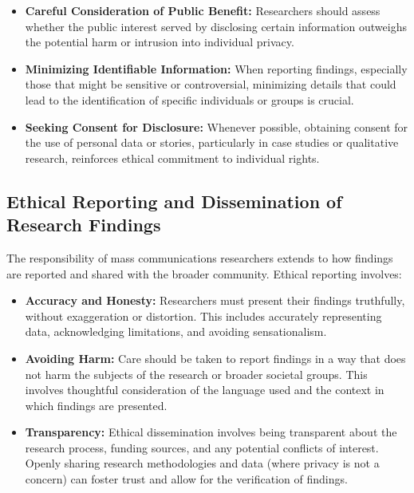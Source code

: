 \documentclass[
]{book}
\providecommand{\tightlist}{%
  \setlength{\itemsep}{0pt}\setlength{\parskip}{0pt}}
\begin{document}
\begin{itemize}
\tightlist
\item
  \textbf{Careful Consideration of Public Benefit:} Researchers should assess whether the public interest served by disclosing certain information outweighs the potential harm or intrusion into individual privacy.
\item
  \textbf{Minimizing Identifiable Information:} When reporting findings, especially those that might be sensitive or controversial, minimizing details that could lead to the identification of specific individuals or groups is crucial.
\item
  \textbf{Seeking Consent for Disclosure:} Whenever possible, obtaining consent for the use of personal data or stories, particularly in case studies or qualitative research, reinforces ethical commitment to individual rights.
\end{itemize}

\hypertarget{ethical-reporting-and-dissemination-of-research-findings}{%
\subsection*{Ethical Reporting and Dissemination of Research Findings}\label{ethical-reporting-and-dissemination-of-research-findings}}

The responsibility of mass communications researchers extends to how findings are reported and shared with the broader community. Ethical reporting involves:

\begin{itemize}
\item
  \textbf{Accuracy and Honesty:} Researchers must present their findings truthfully, without exaggeration or distortion. This includes accurately representing data, acknowledging limitations, and avoiding sensationalism.
\item
  \textbf{Avoiding Harm:} Care should be taken to report findings in a way that does not harm the subjects of the research or broader societal groups. This involves thoughtful consideration of the language used and the context in which findings are presented.
\item
  \textbf{Transparency:} Ethical dissemination involves being transparent about the research process, funding sources, and any potential conflicts of interest. Openly sharing research methodologies and data (where privacy is not a concern) can foster trust and allow for the verification of findings.
\end{itemize}
\end{document}
